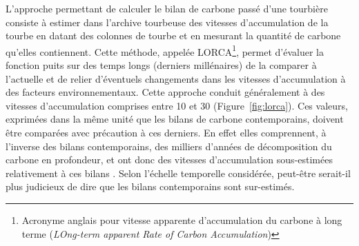L'approche permettant de calculer le bilan de carbone passé d'une tourbière consiste à estimer dans l'archive tourbeuse des vitesses d'accumulation de la tourbe en datant des colonnes de tourbe et en mesurant la quantité de carbone qu'elles contiennent.
Cette méthode, appelée LORCA\footnote{Acronyme anglais pour vitesse apparente d'accumulation du carbone à long terme (\textit{LOng-term apparent Rate of Carbon Accumulation})}, permet d'évaluer la fonction puits sur des temps longs (derniers millénaires) de la comparer à l'actuelle et de relier d'éventuels changements dans les vitesses d'accumulation à des facteurs environnementaux.
Cette approche conduit généralement à des vitesses d'accumulation comprises entre 10 et \SI{30}{\gcma} (Figure~\ref{fig:lorca}).
Ces valeurs, exprimées dans la même unité que les bilans de carbone contemporains, doivent être comparées avec précaution à ces derniers.
En effet elles comprennent, à l'inverse des bilans contemporains, des milliers d'années de décomposition du carbone en profondeur, et ont donc des vitesses d'accumulation sous-estimées relativement à ces bilans \citep{yu2009}.
Selon l'échelle temporelle considérée, peut-être serait-il plus judicieux de dire que les bilans contemporains sont sur-estimés.

